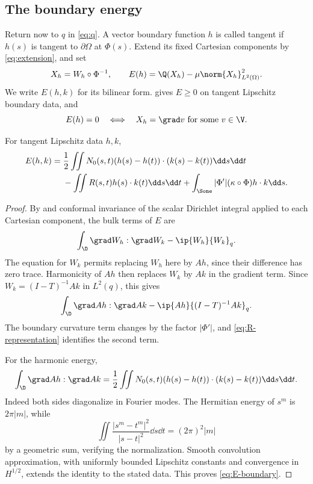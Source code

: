 \subsection{The boundary energy}\label{subsec:energy}

Return now to $q$ in \eqref{eq:q}. A vector boundary function $h$ is called tangent if $h(s)$ is tangent to $\partial\Omega$ at $\Phi(s)$. Extend its fixed Cartesian components by \eqref{eq:extension}, and set
\[
X_h=W_h\circ\Phi^{-1},\qquad
E(h)=\Q(X_h)-\mu\norm{X_h}_{L^2(\Omega)}^2.
\]
We write $E(h,k)$ for its bilinear form.  gives $E\ge0$ on tangent Lipschitz boundary data, and
\begin{equation}\label{eq:E-nullspace}
E(h)=0\quad\Longleftrightarrow\quad
X_h=\grad v\text{ for some }v\in\V.
\end{equation}

\begin{lemma}\label{lem:boundary-energy}
For tangent Lipschitz data $h,k$,
\begin{align}
E(h,k)={}&\frac12\iint N_0(s,t)
(h(s)-h(t))\cdot(k(s)-k(t))\dd s\dd t\notag\\
&-\iint R(s,t)h(s)\cdot k(t)\dd s\dd t
+\int_{\Sone}|\Phi'|(\kappa\circ\Phi)h\cdot k\dd s.
\label{eq:E-boundary}
\end{align}
\end{lemma}
\begin{proof}
By  and conformal invariance of the scalar Dirichlet integral applied to each Cartesian component, the bulk terms of $E$ are
\[
\int_\D\grad W_h:\grad W_k-\ip{W_h}{W_k}_q.
\]
The equation for $W_k$ permits replacing $W_h$ here by $Ah$, since their difference has zero trace. Harmonicity of $Ah$ then replaces $W_k$ by $Ak$ in the gradient term. Since $W_k=(I-T)^{-1}Ak$ in $L^2(q)$, this gives
\[
\int_\D\grad Ah:\grad Ak-\ip{Ah}{(I-T)^{-1}Ak}_q.
\]
The boundary curvature term changes by the factor $|\Phi'|$, and \eqref{eq:R-representation} identifies the second term.

For the harmonic energy,
\begin{equation}\label{eq:harmonic-energy}
\int_\D\grad Ah:\grad Ak
=\frac12\iint N_0(s,t)(h(s)-h(t))\cdot(k(s)-k(t))\dd s\dd t.
\end{equation}
Indeed both sides diagonalize in Fourier modes. The Hermitian energy of $s^m$ is $2\pi|m|$, while
\[
\iint\frac{|s^m-t^m|^2}{|s-t|^2}\dd s\dd t=(2\pi)^2|m|
\]
by a geometric sum, verifying the normalization. Smooth convolution approximation, with uniformly bounded Lipschitz constants and convergence in $H^{1/2}$, extends the identity to the stated data. This proves \eqref{eq:E-boundary}.
\end{proof}

